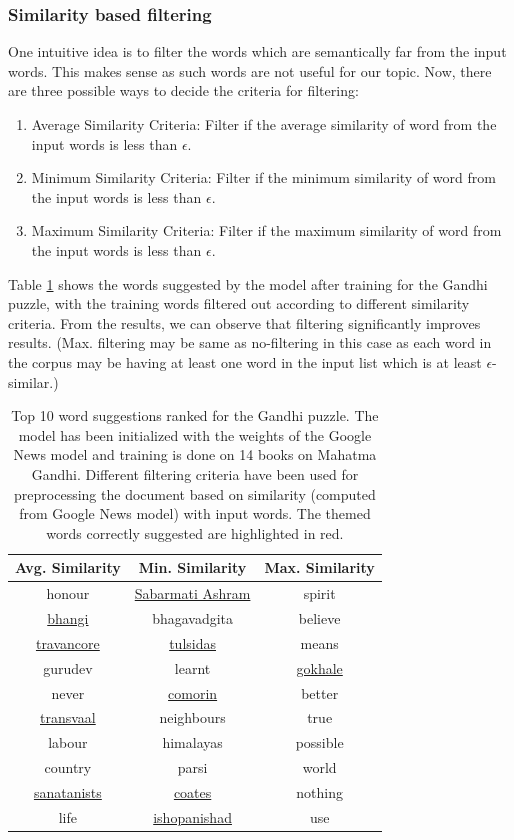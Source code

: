 \documentclass[twoside]{article}
\begin{document}
\subsubsection{Similarity based filtering}
One intuitive idea is to filter the words which are semantically far from the input words. This makes sense as such words are not useful for our topic. Now, there are three possible ways to decide the criteria for filtering:
\begin{enumerate}
  \item Average Similarity Criteria: Filter if the average similarity of word from the input words is less than $ \epsilon$.
  \item Minimum Similarity Criteria: Filter if the minimum similarity of word from the input words is less than $\epsilon$.
  \item Maximum Similarity Criteria: Filter if the maximum similarity of word from the input words is less than $\epsilon$.
\end{enumerate}
Table \ref{tab:table10} shows the words suggested by the model after training for the Gandhi puzzle, with the training words filtered out according to different similarity criteria. From the results, we can observe that filtering significantly improves results. (Max. filtering may be same as no-filtering in this case as each word in the corpus may be having at least one word in the input list which is at least $\epsilon$-similar.)

\begin{table}[h!]
  \begin{center}
    \begin{tabular}{c c c}
      \toprule
      \textbf{Avg. Similarity} & \textbf{Min. Similarity} & \textbf{Max. Similarity} \\ 
      \midrule
      honour & \ul{Sabarmati Ashram} & spirit \\
      \ul{bhangi} & bhagavadgita & believe\\
      \ul{travancore} & \ul{tulsidas} & means\\
      gurudev & learnt & \ul{gokhale}\\
      never & \ul{comorin} & better \\
      \ul{transvaal} & neighbours & true \\
      labour & himalayas & possible\\
      country & parsi & world\\
      \ul{sanatanists} & \ul{coates} & nothing \\
      life & \ul{ishopanishad} & use \\
      \bottomrule
    \end{tabular}
    \caption{Top 10 word suggestions ranked for the Gandhi puzzle. The model has been initialized with the weights of the Google News model and training is done on 14 books on Mahatma Gandhi. Different filtering criteria have been used for preprocessing the document based on similarity (computed from Google News model) with input words. The themed words correctly suggested are highlighted in red.}
    \label{tab:table10}
  \end{center}
\end{table} 
\end{document}

